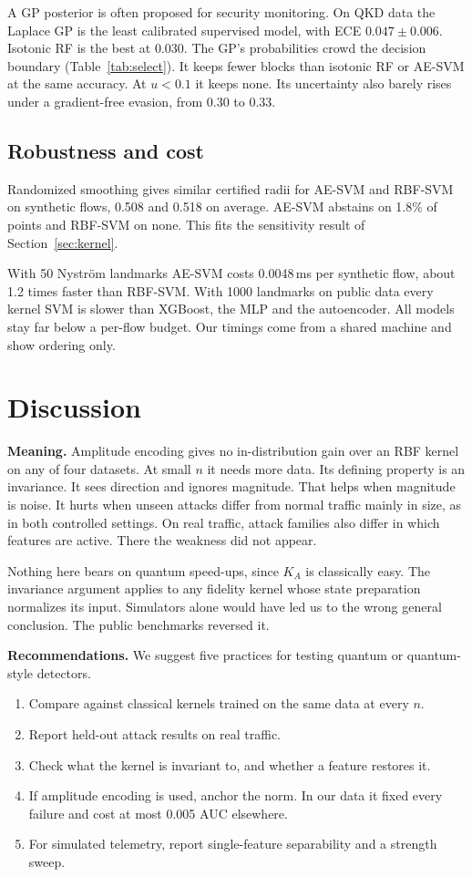\documentclass[journal]{IEEEtran}
\begin{document}
A GP posterior is often proposed for security monitoring. On QKD data the Laplace
GP is the least calibrated supervised model, with ECE $0.047\pm0.006$. Isotonic RF
is the best at 0.030. The GP's probabilities crowd the decision boundary
(Table~\ref{tab:select}). It keeps fewer blocks than isotonic RF or AE-SVM at the
same accuracy. At $u<0.1$ it keeps none. Its uncertainty also barely rises under a
gradient-free evasion, from 0.30 to 0.33.

\subsection{Robustness and cost}
\label{sec:res-robust}

Randomized smoothing gives similar certified radii for AE-SVM and RBF-SVM on
synthetic flows, 0.508 and 0.518 on average. AE-SVM abstains on 1.8\% of points
and RBF-SVM on none. This fits the sensitivity result of Section~\ref{sec:kernel}.

With 50 Nystr\"om landmarks AE-SVM costs 0.0048\,ms per synthetic flow, about 1.2
times faster than RBF-SVM. With 1000 landmarks on public data every kernel SVM is
slower than XGBoost, the MLP and the autoencoder. All models stay far below a
per-flow budget. Our timings come from a shared machine and show ordering only.

\section{Discussion}
\label{sec:discussion}

\textbf{Meaning.} Amplitude encoding gives no in-distribution gain over an RBF
kernel on any of four datasets. At small $n$ it needs more data. Its defining
property is an invariance. It sees direction and ignores magnitude. That helps when
magnitude is noise. It hurts when unseen attacks differ from normal traffic mainly
in size, as in both controlled settings. On real traffic, attack families also
differ in which features are active. There the weakness did not appear.

Nothing here bears on quantum speed-ups, since $K_A$ is classically easy. The
invariance argument applies to any fidelity kernel whose state preparation
normalizes its input. Simulators alone would have led us to the wrong general
conclusion. The public benchmarks reversed it.

\textbf{Recommendations.} We suggest five practices for testing quantum or
quantum-style detectors.
\begin{enumerate}
\item Compare against classical kernels trained on the same data at every $n$.
\item Report held-out attack results on real traffic.
\item Check what the kernel is invariant to, and whether a feature restores it.
\item If amplitude encoding is used, anchor the norm. In our data it fixed every
  failure and cost at most 0.005 AUC elsewhere.
\item For simulated telemetry, report single-feature separability and a strength
  sweep.
\end{enumerate}
\end{document}
